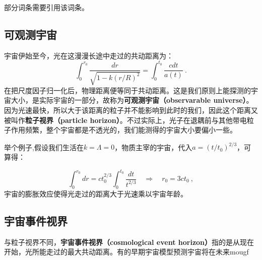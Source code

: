 
\begin{issues}
\issueTODO
部分词条需要引用该词条。
\end{issues}

\subsection{可观测宇宙}
宇宙伊始至今，光在这漫漫长途中走过的共动距离为：
\begin{equation}
\int_{0}^{r_{0}} \frac{d r}{\sqrt{1-k (r/R)^{2}}}=\int_{0}^{t_{0}} \frac{c d t}{a(t)}~.
\end{equation}
在把尺度因子归一化后，物理距离便等同于共动距离。这是我们原则上能探测的宇宙大小，是实际宇宙的一部分，故称为\textbf{可观测宇宙（observarable universe）}。因为光速最快，所以大于该距离的粒子并不能影响到此时的我们，因此这个距离又被叫作\textbf{粒子视界（particle horizon）}。不过实际上，光子在退耦前与其他带电粒子作用频繁，整个宇宙都是不透光的，我们能测得的宇宙大小要偏小一些。

举个例子,假设我们生活在$k=\Lambda=0$，物质主宰的宇宙，代入$a=(t/t_0)^{2/3}$，可算得：

\begin{equation}\int_0^{r_0}dr=ct_0^{2/3}\int_0^{t_0}\frac{dt}{t^{2/3}}\quad\Longrightarrow\quad r_0=3ct_0 ~,\end{equation}
宇宙的膨胀效应使得光走过的距离大于光速乘以宇宙年龄。

\subsection{宇宙事件视界}
与粒子视界不同，\textbf{宇宙事件视界（cosmological event horizon）}指的是从现在开始，光所能走过的最大共动距离。有的早期宇宙模型预测宇宙将在未来mougf